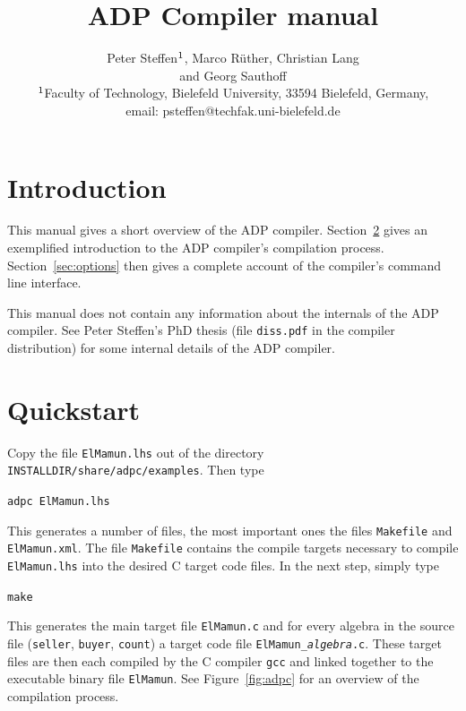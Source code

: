 \documentclass[a4paper]{article}
\begin{document}
\title{ADP Compiler \rsversion{} manual}

\author{Peter Steffen$^{\rm 1}$, Marco R\"uther, Christian Lang\\ 
    and Georg Sauthoff\\[.5cm] 
    $^{\rm 1}$Faculty of Technology, Bielefeld University, 33594
    Bielefeld, Germany, \\
    email: psteffen@techfak.uni-bielefeld.de}

\maketitle
\tableofcontents

\section{Introduction}

This manual gives a short overview of the ADP
compiler. Section~\ref{sec:start} gives an exemplified introduction
to the ADP compiler's compilation process. Section~\ref{sec:options}
then gives a complete account of the compiler's command line interface.

This manual does not contain any information about the internals of
the ADP compiler. See Peter Steffen's PhD thesis (file
\texttt{diss.pdf} in the compiler distribution) for some internal
details of the ADP compiler.

\section{Quickstart}
\label{sec:start}

Copy the file \texttt{ElMamun.lhs} out of the directory
\texttt{INSTALLDIR/share/adpc/examples}. Then type 

\texttt{adpc ElMamun.lhs}

This generates a number of files, the most important ones the files
\texttt{Makefile} and \texttt{ElMamun.xml}. The file \texttt{Makefile}
contains the compile targets necessary to compile \texttt{ElMamun.lhs}
into the desired C target code files. In the next step, simply type

\texttt{make}

This generates the main target file \texttt{ElMamun.c} and for every
algebra in the source file (\texttt{seller}, \texttt{buyer},
\texttt{count}) a target code file \texttt{ElMamun\_{\it algebra}.c}.
These target files are then each compiled by the C compiler
\texttt{gcc} and linked together to the executable binary file
\texttt{ElMamun}. See Figure~\ref{fig:adpc} for an overview of the
compilation process.
\end{document}

